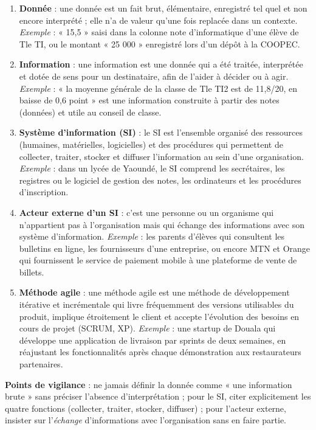 \documentclass[11pt]{article}
\begin{document}
\begin{corrige}
\begin{enumerate}
    \item \textbf{Donnée} : une donnée est un fait brut, élémentaire, enregistré tel quel et non encore interprété ; elle n'a de valeur qu'une fois replacée dans un contexte. \emph{Exemple} : « 15,5 » saisi dans la colonne note d'informatique d'une élève de Tle TI, ou le montant « 25 000 » enregistré lors d'un dépôt à la COOPEC.
    \item \textbf{Information} : une information est une donnée qui a été traitée, interprétée et dotée de sens pour un destinataire, afin de l'aider à décider ou à agir. \emph{Exemple} : « la moyenne générale de la classe de Tle TI2 est de 11,8/20, en baisse de 0,6 point » est une information construite à partir des notes (données) et utile au conseil de classe.
    \item \textbf{Système d'information (SI)} : le SI est l'ensemble organisé des ressources (humaines, matérielles, logicielles) et des procédures qui permettent de collecter, traiter, stocker et diffuser l'information au sein d'une organisation. \emph{Exemple} : dans un lycée de Yaoundé, le SI comprend les secrétaires, les registres ou le logiciel de gestion des notes, les ordinateurs et les procédures d'inscription.
    \item \textbf{Acteur externe d'un SI} : c'est une personne ou un organisme qui n'appartient pas à l'organisation mais qui échange des informations avec son système d'information. \emph{Exemple} : les parents d'élèves qui consultent les bulletins en ligne, les fournisseurs d'une entreprise, ou encore MTN et Orange qui fournissent le service de paiement mobile à une plateforme de vente de billets.
    \item \textbf{Méthode agile} : une méthode agile est une méthode de développement itérative et incrémentale qui livre fréquemment des versions utilisables du produit, implique étroitement le client et accepte l'évolution des besoins en cours de projet (SCRUM, XP). \emph{Exemple} : une startup de Douala qui développe une application de livraison par sprints de deux semaines, en réajustant les fonctionnalités après chaque démonstration aux restaurateurs partenaires.
\end{enumerate}
\textbf{Points de vigilance} : ne jamais définir la donnée comme « une information brute » sans préciser l'absence d'interprétation ; pour le SI, citer explicitement les quatre fonctions (collecter, traiter, stocker, diffuser) ; pour l'acteur externe, insister sur l'\emph{échange} d'informations avec l'organisation sans en faire partie.
\end{corrige}
\end{document}
